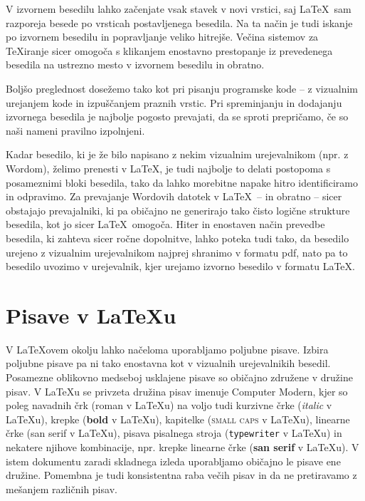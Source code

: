 \documentclass[a4paper,12pt,openright]{book}
\begin{document}
V izvornem besedilu lahko začenjate vsak stavek v novi vrstici, saj \LaTeX\ sam razporeja besede po vrsticah postavljenega besedila.
Na ta način je tudi iskanje po izvornem besedilu in popravljanje veliko hitrejše.
Večina sistemov za \TeX{}iranje sicer omogoča s klikanjem enostavno prestopanje iz prevedenega besedila na ustrezno mesto v izvornem besedilu in obratno.

Boljšo preglednost dosežemo tako kot pri pisanju programske kode -- z vizualnim urejanjem kode in izpuščanjem praznih vrstic.
Pri spreminjanju in dodajanju izvornega besedila je najbolje pogosto prevajati, da se sproti prepričamo, če so naši nameni pravilno izpolnjeni.

Kadar besedilo, ki je že bilo napisano z nekim vizualnim urejevalnikom (npr. z Wordom), želimo prenesti v \LaTeX, je tudi najbolje to delati postopoma s posameznimi bloki besedila,
tako da lahko morebitne napake hitro identificiramo in odpravimo.
Za prevajanje Wordovih datotek v \LaTeX\ -- in obratno -- sicer obstajajo prevajalniki, ki pa običajno ne generirajo tako čisto logične strukture besedila, kot jo sicer \LaTeX\ omogoča.
Hiter in enostaven način prevedbe besedila, ki  zahteva sicer ročne dopolnitve, lahko poteka tudi tako, da besedilo urejeno z vizualnim urejevalnikom najprej shranimo v formatu pdf,
nato pa to besedilo uvozimo v urejevalnik, kjer urejamo izvorno besedilo v formatu \LaTeX.

\section{Pisave v \LaTeX u}

V  \LaTeX ovem okolju lahko načeloma uporabljamo poljubne pisave.
Izbira poljubne pisave pa ni tako enostavna kot v vizualnih urejevalnikih besedil.
Posamezne oblikovno medseboj usklajene pisave so običajno združene v družine pisav.
V \LaTeX u se privzeta družina pisav imenuje Computer Modern,
kjer so poleg navadnih črk (roman v \LaTeX u) na voljo tudi kurzivne črke (\textit{italic} v \LaTeX u),
krepke (\textbf{bold} v \LaTeX u), kapitelke (\textsc{small caps} v \LaTeX u), linearne črke ({\textsf{san serif} v \LaTeX u}), pisava pisalnega stroja (\texttt{typewriter} v \LaTeX u) in nekatere njihove kombinacije, npr. krepke linearne črke
({\textbf{\textsf{san serif}} v \LaTeX u}).
V istem dokumentu zaradi skladnega izleda uporabljamo običajno le pisave ene družine.
Pomembna je tudi konsistentna raba večih pisav in da ne pretiravamo z mešanjem različnih pisav.
\end{document}
